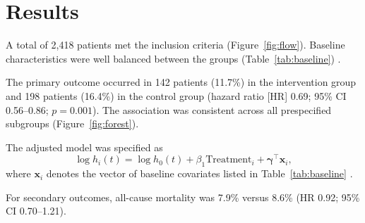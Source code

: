 \section{Results}
\label{sec:results}

A total of 2,418 patients met the inclusion criteria (Figure~\ref{fig:flow}). Baseline characteristics were well balanced between the groups (Table~\ref{tab:baseline}) \cite{austin2011introduction}.

The primary outcome occurred in 142 patients (11.7\%) in the intervention group and 198 patients (16.4\%) in the control group (hazard ratio [HR] 0.69; 95\% CI 0.56--0.86; $p = 0.001$). The association was consistent across all prespecified subgroups (Figure~\ref{fig:forest}).

The adjusted model was specified as
\begin{equation}
  \log h_i(t) = \log h_0(t) + \beta_1 \text{Treatment}_i + \boldsymbol{\gamma}^\top \mathbf{x}_i ,
  \label{eq:cox}
\end{equation}
where $\mathbf{x}_i$ denotes the vector of baseline covariates listed in Table~\ref{tab:baseline} \cite{cox1972regression, therneau2000modeling}.

For secondary outcomes, all-cause mortality was 7.9\% versus 8.6\% (HR 0.92; 95\% CI 0.70--1.21).
